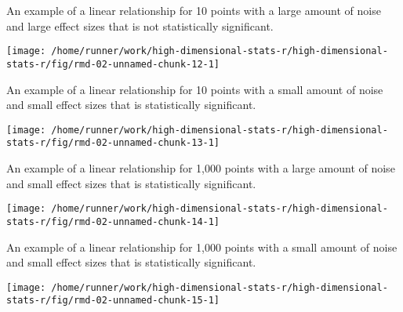 \documentclass[ignorenonframetext,]{beamer}
\begin{document}
\begin{frame}{An example of a linear relationship for 10 points with a
large amount of noise and large effect sizes that is not statistically
significant.}
\protect\hypertarget{an-example-of-a-linear-relationship-for-10-points-with-a-large-amount-of-noise-and-large-effect-sizes-that-is-not-statistically-significant.}{}

\texttt{[image: /home/runner/work/high-dimensional-stats-r/high-dimensional-stats-r/fig/rmd-02-unnamed-chunk-12-1]}



\end{frame}

\begin{frame}{An example of a linear relationship for 10 points with a
small amount of noise and small effect sizes that is statistically
significant.}
\protect\hypertarget{an-example-of-a-linear-relationship-for-10-points-with-a-small-amount-of-noise-and-small-effect-sizes-that-is-statistically-significant.}{}

\texttt{[image: /home/runner/work/high-dimensional-stats-r/high-dimensional-stats-r/fig/rmd-02-unnamed-chunk-13-1]}



\end{frame}

\begin{frame}{An example of a linear relationship for 1,000 points with
a large amount of noise and small effect sizes that is statistically
significant.}
\protect\hypertarget{an-example-of-a-linear-relationship-for-1000-points-with-a-large-amount-of-noise-and-small-effect-sizes-that-is-statistically-significant.}{}

\texttt{[image: /home/runner/work/high-dimensional-stats-r/high-dimensional-stats-r/fig/rmd-02-unnamed-chunk-14-1]}



\end{frame}

\begin{frame}{An example of a linear relationship for 1,000 points with
a small amount of noise and small effect sizes that is statistically
significant.}
\protect\hypertarget{an-example-of-a-linear-relationship-for-1000-points-with-a-small-amount-of-noise-and-small-effect-sizes-that-is-statistically-significant.}{}

\texttt{[image: /home/runner/work/high-dimensional-stats-r/high-dimensional-stats-r/fig/rmd-02-unnamed-chunk-15-1]}



\end{frame}
\end{document}
